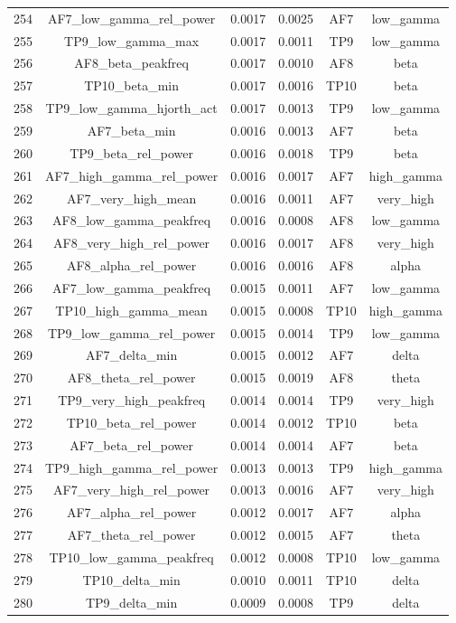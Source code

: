 \begin{table}[hptb]
\begin{table}
\begin{tabular}{cccccc}
254 & AF7_low_gamma_rel_power & 0.0017 & 0.0025 & AF7 & low_gamma \\
255 & TP9_low_gamma_max & 0.0017 & 0.0011 & TP9 & low_gamma \\
256 & AF8_beta_peakfreq & 0.0017 & 0.0010 & AF8 & beta \\
257 & TP10_beta_min & 0.0017 & 0.0016 & TP10 & beta \\
258 & TP9_low_gamma_hjorth_act & 0.0017 & 0.0013 & TP9 & low_gamma \\
259 & AF7_beta_min & 0.0016 & 0.0013 & AF7 & beta \\
260 & TP9_beta_rel_power & 0.0016 & 0.0018 & TP9 & beta \\
261 & AF7_high_gamma_rel_power & 0.0016 & 0.0017 & AF7 & high_gamma \\
262 & AF7_very_high_mean & 0.0016 & 0.0011 & AF7 & very_high \\
263 & AF8_low_gamma_peakfreq & 0.0016 & 0.0008 & AF8 & low_gamma \\
264 & AF8_very_high_rel_power & 0.0016 & 0.0017 & AF8 & very_high \\
265 & AF8_alpha_rel_power & 0.0016 & 0.0016 & AF8 & alpha \\
266 & AF7_low_gamma_peakfreq & 0.0015 & 0.0011 & AF7 & low_gamma \\
267 & TP10_high_gamma_mean & 0.0015 & 0.0008 & TP10 & high_gamma \\
268 & TP9_low_gamma_rel_power & 0.0015 & 0.0014 & TP9 & low_gamma \\
269 & AF7_delta_min & 0.0015 & 0.0012 & AF7 & delta \\
270 & AF8_theta_rel_power & 0.0015 & 0.0019 & AF8 & theta \\
271 & TP9_very_high_peakfreq & 0.0014 & 0.0014 & TP9 & very_high \\
272 & TP10_beta_rel_power & 0.0014 & 0.0012 & TP10 & beta \\
273 & AF7_beta_rel_power & 0.0014 & 0.0014 & AF7 & beta \\
274 & TP9_high_gamma_rel_power & 0.0013 & 0.0013 & TP9 & high_gamma \\
275 & AF7_very_high_rel_power & 0.0013 & 0.0016 & AF7 & very_high \\
276 & AF7_alpha_rel_power & 0.0012 & 0.0017 & AF7 & alpha \\
277 & AF7_theta_rel_power & 0.0012 & 0.0015 & AF7 & theta \\
278 & TP10_low_gamma_peakfreq & 0.0012 & 0.0008 & TP10 & low_gamma \\
279 & TP10_delta_min & 0.0010 & 0.0011 & TP10 & delta \\
280 & TP9_delta_min & 0.0009 & 0.0008 & TP9 & delta \\
\bottomrule
\end{tabular}
\end{table}
\end{table}
